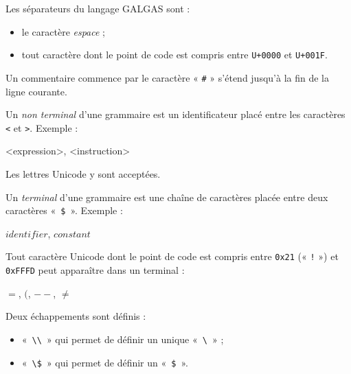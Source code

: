 Les séparateurs du langage GALGAS sont :
\begin{itemize}
  \item le caractère \emph{espace} ;
  \item tout caractère dont le point de code est compris entre \texttt{U+0000} et \texttt{U+001F}. 
\end{itemize}




Un commentaire commence par le caractère « \texttt{\#} » s'étend jusqu'à la fin de la ligne courante.









Un \emph{non terminal} d'une grammaire est un identificateur placé entre les caractères \texttt{<} et \texttt{>}. Exemple :

\begin{galgas}
 <expression>, <instruction>
\end{galgas}

Les lettres Unicode y sont acceptées.






Un \emph{terminal} d'une grammaire est une chaîne de caractères placée entre deux caractères «~\texttt{\$}~». Exemple :

\begin{galgas}
 $identifier$, $constant$
\end{galgas}

Tout caractère Unicode dont le point de code est compris entre \texttt{0x21} (« \texttt{!} ») et \texttt{0xFFFD} peut apparaître dans un terminal :
\begin{galgas}
 $=$, $($, $--$, $≠$
\end{galgas}

Deux échappements sont définis :
\begin{itemize}
\item «~\texttt{\textbackslash\textbackslash}~» qui permet de définir un unique «~\texttt{\textbackslash}~» ;
\item «~\texttt{\textbackslash\$}~» qui permet de définir un «~\texttt{\$}~».
\end{itemize}

